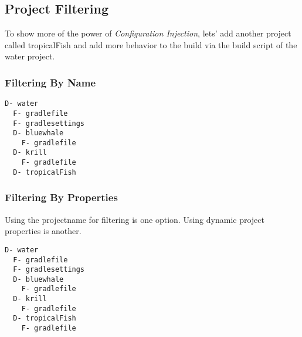 \subsection{Project Filtering} %
\label{sub:project_filtering}
To show more of the power of \emph{Configuration Injection}, lets' add another project called tropicalFish and add more behavior to the build via the build script of the water project.

\subsubsection{Filtering By Name} %
\label{ssub:filtering_by_name}
\begin{minipage}[t]{7cm}
\begin{Verbatim}[frame=single,label=Project Tree]
D- water
  F- gradlefile
  F- gradlesettings
  D- bluewhale
    F- gradlefile
  D- krill
    F- gradlefile
  D- tropicalFish	
\end{Verbatim}
\end{minipage}	
\begin{minipage}[t]{9cm}
\end{minipage}

\subsubsection{Filtering By Properties} %
\label{ssub:filtering_by_properties}

Using the projectname for filtering is one option. Using dynamic project properties is another.
\\

\begin{minipage}[t]{7cm}
\begin{Verbatim}[frame=single,label=Project Tree]
D- water
  F- gradlefile
  F- gradlesettings
  D- bluewhale
    F- gradlefile
  D- krill
    F- gradlefile
  D- tropicalFish
    F- gradlefile	
\end{Verbatim}
\end{minipage}	
\begin{minipage}[t]{9cm}
\end{minipage}


